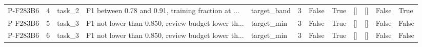 \begin{tabular}{lrlllrllllll}
   P-F283B6 &        4 & task\_2 & F1 between 0.78 and 0.91, training fraction at ... &   target\_band &          3 &          False &                  True &               [] &             [] &              False &             True \\
   P-F283B6 &        5 & task\_3 & F1 not lower than 0.850, review budget lower th... &    target\_min &          3 &          False &                  True &               [] &             [] &              False &            False \\
   P-F283B6 &        6 & task\_3 & F1 not lower than 0.850, review budget lower th... &    target\_min &          3 &          False &                  True &               [] &             [] &              False &            False \\
\bottomrule
\end{tabular}
